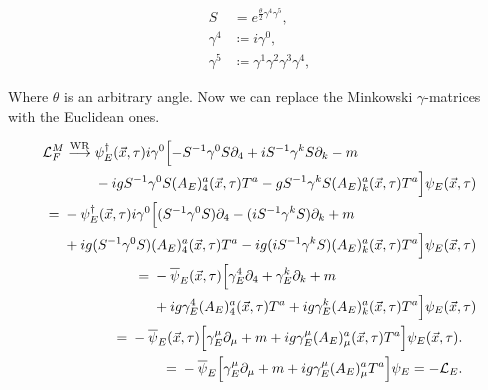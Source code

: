 \documentclass{article}
\theoremstyle{plain} %
\theoremstyle{convention} %
\theoremstyle{remark} %
\numberwithin{equation}{section}
\begin{document}
\begin{align*}
    S &= e^{\frac{\theta}{2} \gamma^4 \gamma^5 }, \\
    \gamma^4 &\coloneqq i \gamma^0, \\
    \gamma^5 &\coloneqq \gamma^1 \gamma^2 \gamma^3 \gamma^4,
\end{align*}

Where $\theta$ is an arbitrary angle. Now we can replace the Minkowski $\gamma$-matrices with the Euclidean ones.

\begin{align*}
\begin{split}
    \mathcal{L}_{F}^M \stackrel{\text{WR}}{\longrightarrow}{}& \psi_E^{\dagger}(\vec{x},\tau) i \gamma^0 \Bigl[ - S^{-1} \gamma^0 S \partial_4 + i S^{-1} \gamma^k S \partial_k - m\\
         & - i g S^{-1} \gamma^0 S (A_E)_4^a(\vec{x}, \tau) T^a - g S^{-1} \gamma^k S (A_E)_k^a(\vec{x}, \tau) T^a \Bigr] \psi_E(\vec{x},\tau)
\end{split} \\
\begin{split}
    ={}& - \psi_E^{\dagger}(\vec{x},\tau) i \gamma^0 \Bigl[ (S^{-1} \gamma^0 S) \partial_4 - (i S^{-1} \gamma^k S) \partial_k + m\\
         & + i g (S^{-1} \gamma^0 S) (A_E)_4^a(\vec{x}, \tau) T^a - i g (i S^{-1} \gamma^k S) (A_E)_k^a(\vec{x}, \tau) T^a \Bigr] \psi_E(\vec{x},\tau)
\end{split} \\
\begin{split}
    ={}& - \overline{\psi}_E(\vec{x},\tau) \Bigl[ \gamma_E^4 \partial_4 + \gamma_E^k \partial_k + m \\
         & + ig \gamma_E^4 (A_E)_4^a(\vec{x}, \tau) T^a + ig \gamma_E^k (A_E)_k^a(\vec{x}, \tau) T^a \Bigr] \psi_E(\vec{x},\tau)
\end{split} \\
\begin{split}
    ={}& - \overline{\psi}_E(\vec{x},\tau) \Bigl[ \gamma_E^{\mu} \partial_{\mu} + m + ig \gamma_E^{\mu} (A_E)_{\mu}^a(\vec{x}, \tau) T^a \Bigr] \psi_E(\vec{x},\tau).
\end{split} \\
\begin{split}
    ={}& - \overline{\psi}_E \Bigl[ \gamma_E^{\mu} \partial_{\mu} + m + ig \gamma_E^{\mu} (A_E)_{\mu}^a T^a \Bigr] \psi_E = - \mathcal{L}_E.
\end{split}
\end{align*}
\end{document}
